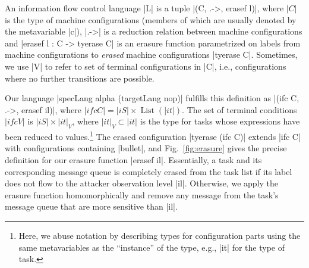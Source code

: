 \begin{definition}
    An information flow control language |L| is a tuple |(C, .->,
    erasef l)|, where $|C|$ is the type of machine configurations (members
    of which are usually denoted by the metavariable |c|), |.->| is a
    reduction relation between machine configurations and |erasef l : C -> tyerase C|
    is an erasure function parametrized on labels from machine configurations to \emph{erased} machine
    configurations |tyerase C|.  Sometimes, we use |V| to refer to set of
     terminal configurations in |C|, i.e., configurations where
     no further transitions are possible.
\end{definition}

Our language |specLang alpha (targetLang nop)| fulfills
this definition as |(ifc C, .->, erasef il)|, where
$|ifc C| = |iS| \times \operatorname{List}(|it|)$.  The set of terminal conditions
$|ifc V|$ is $|iS| \times |it|_V$, where $|it|_V \subset |it|$ is the
type for tasks whose expressions have been reduced to
values.\footnote{
  Here, we abuse notation by describing types for configuration parts using the
  same metavariables as the ``instance'' of the type, e.g., |it| for the type of
  task.
}
The erased configuration |tyerase (ifc C)| extends |ifc C| with configurations
containing |bullet|, and Fig.~\ref{fig:erasure} gives the precise definition for
our erasure function |erasef il|.
%
Essentially, a task and its corresponding message queue is completely erased from the task
list if its label does not flow to the attacker observation level |il|.
Otherwise, we apply the erasure function homomorphically and remove any message
from the task's message queue that are more sensitive than |il|.

